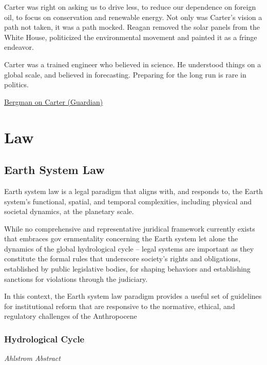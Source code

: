 \documentclass[
]{book}
\begin{document}
Carter was right on asking us to drive less, to reduce our dependence on foreign oil, to focus on conservation and renewable energy. Not only was Carter's vision a path not taken, it was a path mocked. Reagan removed the solar panels from the White House, politicized the environmental movement and painted it as a fringe endeavor.

Carter was a trained engineer who believed in science.
He understood things on a global scale, and believed in forecasting.
Preparing for the long run is rare in politics.

\href{https://www.theguardian.com/us-news/2021/may/03/jimmy-carter-climate-change-carterland-film-biography}{Bergman on Carter (Guardian)}

\hypertarget{law}{%
\chapter{Law}\label{law}}

\hypertarget{earth-system-law}{%
\section{Earth System Law}\label{earth-system-law}}

Earth system law is a legal paradigm that
aligns with, and responds to, the Earth system's functional, spatial, and
temporal complexities, including physical and societal dynamics, at the
planetary scale.

While no comprehensive and
representative juridical framework currently exists that embraces gov­
ernmentality concerning the Earth system let
alone the dynamics of the global hydrological cycle -- legal systems are
important as they constitute the formal rules that underscore society's
rights and obligations, established by public legislative bodies, for
shaping behaviors and establishing sanctions for violations through the
judiciary.

In this context, the Earth system
law paradigm provides a useful set of guidelines for institutional reform
that are responsive to the normative, ethical, and regulatory challenges
of the Anthropocene

\hypertarget{hydrological-cycle}{%
\subsection{Hydrological Cycle}\label{hydrological-cycle}}

\emph{Ahlstrom Abstract}
\end{document}
